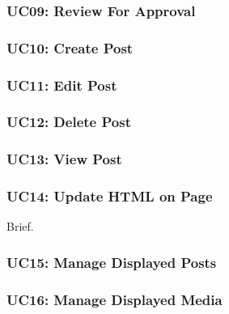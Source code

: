 \documentclass{article}
\begin{document}
\subsubsection{UC09: Review For Approval}

\subsubsection{UC10: Create Post}

\subsubsection{UC11: Edit Post}

\subsubsection{UC12: Delete Post}

\subsubsection{UC13: View Post}

\subsubsection{UC14: Update HTML on Page}
Brief.
\subsubsection{UC15: Manage Displayed Posts}

\subsubsection{UC16: Manage Displayed Media}

\end{document}
